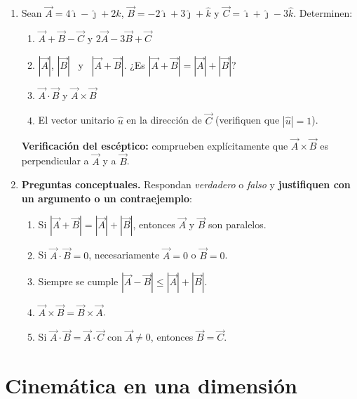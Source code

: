 \documentclass[11pt,letterpaper]{article}
\newcommand{\rulesec}{\vspace{-0.7\baselineskip}{\color{UnalGreen}\rule{\textwidth}{0.8pt}}\vspace{0.2\baselineskip}}
\newcommand{\vv}[1]{\vec{#1}}
\newcommand{\ii}{\hat{\imath}}
\newcommand{\jj}{\hat{\jmath}}
\newcommand{\kk}{\hat{k}}
\begin{document}
	\begin{enumerate}[resume]
		\item Sean $\vv{A} = 4\ii - \jj + 2\kk$, $\vv{B} = -2\ii + 3\jj + \kk$ y $\vv{C} = \ii + \jj - 3\kk$. Determinen:
		\begin{enumerate}
			\item $\vv{A} + \vv{B} - \vv{C}$ \quad y \quad $2\vv{A} - 3\vv{B} + \vv{C}$
			\item $|\vv{A}|$, $|\vv{B}|$ \ y \ $|\vv{A}+\vv{B}|$. ¿Es $|\vv{A}+\vv{B}| = |\vv{A}|+|\vv{B}|$?
			\item $\vv{A}\cdot\vv{B}$ \quad y \quad $\vv{A}\times\vv{B}$
			\item El vector unitario $\hat{u}$ en la dirección de $\vv{C}$ (verifiquen que $|\hat u| = 1$).
		\end{enumerate}
		\textbf{Verificación del escéptico:} comprueben explícitamente que $\vv{A}\times\vv{B}$ es perpendicular a $\vv{A}$ y a $\vv{B}$.
		
		
		\item \textbf{Preguntas conceptuales.} Respondan \textit{verdadero} o \textit{falso} y \textbf{justifiquen con un argumento o un contraejemplo}:
		\begin{enumerate}
			\item Si $|\vv{A}+\vv{B}| = |\vv{A}| + |\vv{B}|$, entonces $\vv{A}$ y $\vv{B}$ son paralelos.
			\item Si $\vv{A}\cdot\vv{B} = 0$, necesariamente $\vv{A}=0$ o $\vv{B}=0$.
			\item Siempre se cumple $|\vv{A}-\vv{B}| \le |\vv{A}| + |\vv{B}|$.
			\item $\vv{A}\times\vv{B} = \vv{B}\times\vv{A}$.
			\item Si $\vv{A}\cdot\vv{B} = \vv{A}\cdot\vv{C}$ con $\vv{A}\neq 0$, entonces $\vv{B} = \vv{C}$.
		\end{enumerate}
	\end{enumerate}
	
	\newpage
	
	\section{Cinemática en una dimensión \normalfont\small\textit{}}
	\rulesec
	
\end{document}

